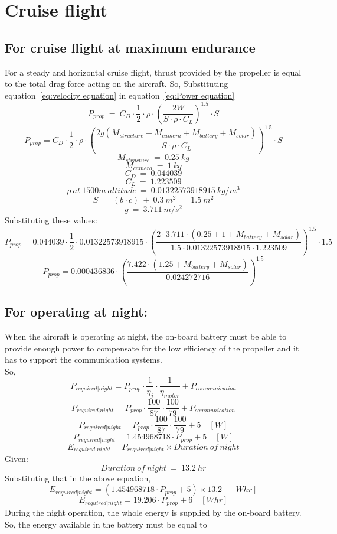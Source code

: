 
\chapter{Cruise flight} \label{chap: Cruise Flight} \section{For cruise flight at maximum endurance} \p For a steady and horizontal cruise flight, thrust provided by the propeller is equal to the total drag force acting on the aircraft. So,    Substituting equation~\ref{eq:velocity equation} in equation~\ref{eq:Power equation} \[ P_{prop} \ = \  C_D \cdot \frac{1}{2} \cdot \rho \cdot \left(\frac{2W}{S \cdot \rho \cdot C_L }\right)^{1.5} \cdot S \] \[ P_{prop} = C_D \cdot \frac{1}{2} \cdot \rho \cdot \left(\frac{2g(M_{structure} + M_{camera} + M_{battery} + M_{solar})}{S \cdot \rho \cdot C_L} \right)^{1.5} \cdot S \] \[ M_{structure} \ = \ 0.25 \ kg \] \[ M_{camera} \ = \ 1 \ kg \] \[ C_D \ = \ 0.044039 \] \[ C_L \ = \ 1.223509 \] \[ \rho \ at \ 1500m \ altitude \ = \ 0.01322573918915 \ kg/m^3 \] \[S \ = \ ( b \cdot c ) \ + \ 0.3 \ m^2 \ = \ 1.5 \ m^2\] \[g \ = \ 3.711 \ m/s^2 \] Substituting these values: \[ P_{prop} = 0.044039 \cdot \frac{1}{2} \cdot 0.01322573918915 \cdot \left(\frac{2 \cdot 3.711 \cdot (0.25 + 1 + M_{battery} + M_{solar})}{1.5 \cdot 0.01322573918915 \cdot 1.223509} \right)^{1.5} \cdot 1.5 \] \[ P_{prop} = 0.000436836 \cdot \left(\frac{7.422 \cdot (1.25 + M_{battery} + M_{solar})}{ 0.024272716 } \right)^{1.5} \]  \section{For operating at night:} \p When the aircraft is operating at night, the on-board battery must be able to provide enough power to compensate for the low efficiency of the propeller and it has to support the communication systems. \\ \p So, \[ P_{required | night} = P_{prop} \cdot \frac{1}{\eta_j} \cdot \frac{1}{\eta_{motor}} + P_{communication} \] \[ P_{required | night} = P_{prop} \cdot \frac{100}{87} \cdot \frac{100}{79} + P_{communication} \] \[ P_{required | night} = P_{prop} \cdot \frac{100}{87} \cdot \frac{100}{79} + 5 \quad [W] \] \[ P_{required | night} = 1.454968718 \cdot P_{prop} + 5 \quad [W] \] \[ E_{required | night} = P_{required | night} \times Duration \ of \ night \] Given: \[ Duration \ of \ night \ = \ 13.2 \ hr \] Substituting that in the above equation, \[ E_{required | night} = (1.454968718 \cdot P_{prop} + 5) \times 13.2 \quad [Whr] \] \[ E_{required | night} = 19.206 \cdot P_{prop} + 6 \quad [Whr] \] \p During the night operation, the whole energy is supplied by the on-board battery. So, the energy available in the battery must be equal to 